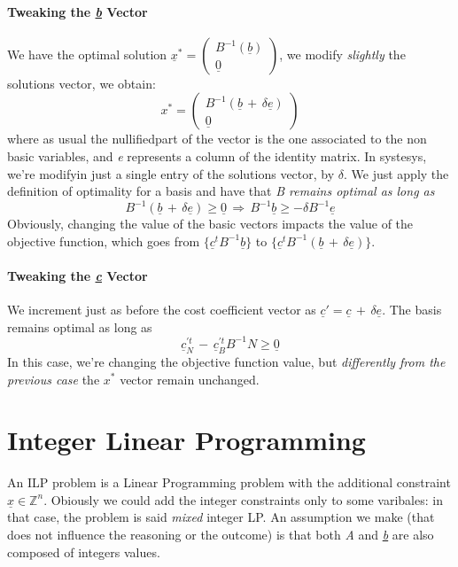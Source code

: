 \documentclass{article}
\begin{document}
				\paragraph{Tweaking the \emph{\underline{b}} Vector}
					We have the optimal solution $\underline{x}^* = \begin{pmatrix} B^{-1}(\underline{b}) \\ \underline{0} \end{pmatrix}$, we modify \emph{slightly} the solutions vector, we obtain:
					\begin{equation}
						x^* = 
						\begin{pmatrix}
							B^{-1} ( \underline{b}\, +\, \delta \underline{e} ) \\
							\underline{0}
						\end{pmatrix}
					\end{equation}
					where as usual the nullifiedpart of the vector is the one associated to the non basic variables, and \emph{e} represents a column of the identity matrix. In systesys, we're modifyin just a single entry of the solutions vector, by $\delta$. We just apply the definition of optimality for a basis and have that \textit{B remains optimal as long as}
					\begin{equation}
						B^{-1} ( \underline{b}\, +\, \delta \underline{e} ) \geq \underline{0} \,\Rightarrow\, B^{-1}\underline{b} \geq -\delta B^{-1} \underline{e}
					\end{equation}
					Obviously, changing the value of the basic vectors impacts the value of the objective function, which goes from $\{\underline{c}^tB^{-1}\underline{b}\}$ to $\{ \underline{c}^tB^{-1} ( \underline{b}\, +\, \delta \underline{e} ) \}$.

				\paragraph{Tweaking the \emph{\underline{c}} Vector}
					We increment just as before the cost coefficient vector as $\underline{c}' = \underline{c}\, +\, \delta \underline{e}$. The basis remains optimal as long as
					\begin{equation}
						\underline{c}_N^{'t}\, -\, \underline{c}_B^{'t}B^{-1}N \geq \underline{0}
					\end{equation}
					In this case, we're changing the objective function value, but \textit{differently from the previous case} the $x^*$ vector remain unchanged.
	
	\clearpage
	\section{Integer Linear Programming}
		An ILP problem is a Linear Programming problem with the additional constraint $\underline{x} \in \mathbb{Z}^n$. Obiously we could add the integer constraints only to some varibales: in that case, the problem is said \textit{mixed} integer LP. An assumption we make (that does not influence the reasoning or the outcome) is that both \emph{A} and \emph{\underline{b}} are also composed of integers values.
\end{document}

